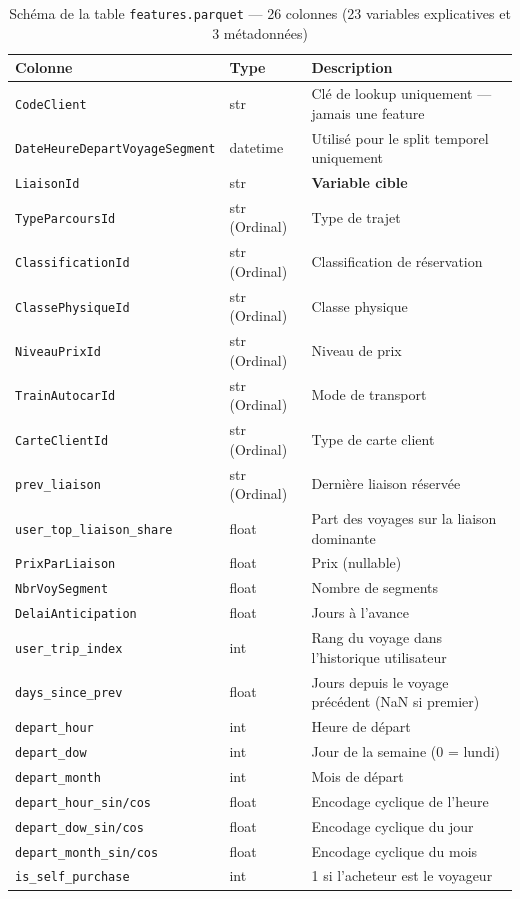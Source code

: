 \documentclass[12pt, a4paper]{report}
\begin{document}
\begin{table}[H]
\centering
\caption{Schéma de la table \texttt{features.parquet} --- 26 colonnes (23 variables explicatives et 3 métadonnées)}
\label{tab:features}
\begin{tabularx}{\textwidth}{|l|l|X|}
\hline
\textbf{Colonne} & \textbf{Type} & \textbf{Description} \\
\hline
\texttt{CodeClient} & str & Clé de lookup uniquement --- jamais une feature \\
\hline
\texttt{DateHeureDepartVoyageSegment} & datetime & Utilisé pour le split temporel uniquement \\
\hline
\texttt{LiaisonId} & str & \textbf{Variable cible} \\
\hline
\texttt{TypeParcoursId} & str (Ordinal) & Type de trajet \\
\hline
\texttt{ClassificationId} & str (Ordinal) & Classification de réservation \\
\hline
\texttt{ClassePhysiqueId} & str (Ordinal) & Classe physique \\
\hline
\texttt{NiveauPrixId} & str (Ordinal) & Niveau de prix \\
\hline
\texttt{TrainAutocarId} & str (Ordinal) & Mode de transport \\
\hline
\texttt{CarteClientId} & str (Ordinal) & Type de carte client \\
\hline
\texttt{prev\_liaison} & str (Ordinal) & Dernière liaison réservée \\
\hline
\texttt{user\_top\_liaison\_share} & float & Part des voyages sur la liaison dominante \\
\hline
\texttt{PrixParLiaison} & float & Prix (nullable) \\
\hline
\texttt{NbrVoySegment} & float & Nombre de segments \\
\hline
\texttt{DelaiAnticipation} & float & Jours à l'avance \\
\hline
\texttt{user\_trip\_index} & int & Rang du voyage dans l'historique utilisateur \\
\hline
\texttt{days\_since\_prev} & float & Jours depuis le voyage précédent (NaN si premier) \\
\hline
\texttt{depart\_hour} & int & Heure de départ \\
\hline
\texttt{depart\_dow} & int & Jour de la semaine (0 = lundi) \\
\hline
\texttt{depart\_month} & int & Mois de départ \\
\hline
\texttt{depart\_hour\_sin/cos} & float & Encodage cyclique de l'heure \\
\hline
\texttt{depart\_dow\_sin/cos} & float & Encodage cyclique du jour \\
\hline
\texttt{depart\_month\_sin/cos} & float & Encodage cyclique du mois \\
\hline
\texttt{is\_self\_purchase} & int & 1 si l'acheteur est le voyageur \\
\hline
\end{tabularx}


\end{table}
\end{document}
